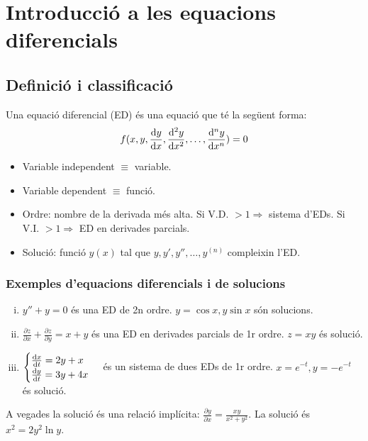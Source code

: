 \section{Introducció a les equacions diferencials}
\subsection{Definició i classificació}
\begin{defi}
Una equació diferencial (ED) és una equació que té la següent forma:
\begin{align}
    f(x, y, \frac{\mathrm{d} y}{\mathrm{d} x}, \frac{\mathrm{d}^{2} y}{\mathrm{d} x^{2}}, \dots , \frac{\mathrm{d}^{n} y}{\mathrm{d} x^{n}}) = 0
\end{align}
\end{defi}
\begin{itemize}
    \item Variable independent $\equiv$ variable.
    \item Variable dependent $\equiv$ funció.
    \item Ordre: nombre de la derivada més alta.
    	\subitem Si V.D. $> 1 \Rightarrow$ sistema d'EDs.
		\subitem Si V.I. $> 1 \Rightarrow$ ED en derivades parcials.
	\item Solució: funció $y(x)$ tal que $y, y', y'', \dots , y^{(n)}$ compleixin l'ED.
\end{itemize}

\subsubsection*{Exemples d'equacions diferencials i de solucions}
\begin{enumerate}[i)]
	\item $y'' + y = 0$ és una ED de 2n ordre.
		\subitem $y = \cos x, y \sin x$ són solucions.
	\item $\displaystyle \frac{\partial z}{\partial x} + \frac{\partial z}{\partial y} = x + y$ és una ED en derivades parcials de 1r ordre.
		\subitem $z = xy$ és solució.
	\item $\begin{cases} \frac{\mathrm{d} x}{\mathrm{d} t} = 2y + x \\ \frac{\mathrm{d} y}{\mathrm{d} t} = 3y + 4x \end{cases}$ és un sistema de dues EDs de 1r ordre.
		\subitem $x = e^{-t}, y = - e^{-t}$ és solució.
\end{enumerate}
A vegades la solució és una relació implícita: $\displaystyle \frac{\partial y}{\partial x} = \frac{x y}{x^{2} + y^{2}}$. La solució és $x^{2} = 2 y^{2} \ln{y}$.

